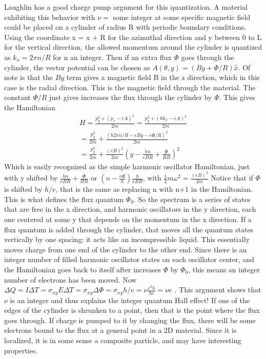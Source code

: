 Laughlin has a good charge pump argument for this quantization. A material exhibiting this behavior with $\nu = $ some integer at some specific magnetic field could be placed on a cylinder of radius R with periodic boundary conditions. Using the coordinate x = x + R for the azimuthal direction and y between 0 to L for the vertical direction, the allowed momentum around the cylinder is quantized as $k_x= 2\pi n/R$ for n an integer. Then if an extra flux $\Phi$ goes through the cylinder, the vector potential can be chosen as $A(\theta,y) = (By+\Phi /R)\hat{x}$. Of note is that the $By$ term gives a magnetic field B in the z direction, which in this case is the radial direction. This is the magnetic field through the material. The constant $\Phi/R$ just gives increases the flux through the cylinder by $\Phi$. This gives the Hamiltonian 
\begin{align}
H = \frac{p_y^2 +(p_x-eA)^2}{2m} = \frac{p_y^2 +(\hbar k_x - eA)^2}{2m} \\
= \frac{p_y^2}{2m} +\frac{(\hbar 2\pi n/R-eBy-e\Phi /R )^2}{2m}\\
= \frac{p_y^2}{2m} +\frac{(eB)^2}{2m}(y-\frac{hn}{eBR}+\frac{\Phi }{RB} )^2
\end{align}
Which is easily recognized as the simple harmonic oscillator Hamiltonian, just with y shifted by $\frac{hn}{eBR}+\frac{\Phi }{RB}$ or $(n-\frac{e\Phi}{h})\frac{h}{eBR}$, with $\frac{1}{2}m\omega^2 = \frac{(eB)^2}{2m}$
Notice that if $\Phi$ is shifted by $h/e$, that is the same as replacing n with n+1 in the Hamiltonian. This is what defines the flux quantum $\Phi_0$. So the spectrum is a series of states that are free in the x direction, and harmonic oscillators in the y direction, each one centered at some y that depends on the momentum in the x direction. If a flux quantum is added through the cylinder, that moves all the quantum states vertically by one spacing; it acts like an incompressible liquid. This essentially moves charge from one end of the cylinder to the other end. Since there is an integer number of filled harmonic oscillator states on each oscillator center, and the Hamiltonian goes back to itself after increases $\Phi$ by $\Phi_0$, this means an integer number of electrons has been moved. Now $\Delta Q = I \Delta T = \sigma_{xy}E \Delta T = \sigma_{xy} \Delta \Phi = \sigma_{xy} h/e = \nu \frac{e^2h}{he} = \nu e $ . This argument shows that $\nu$ is an integer and thus explains the integer quantum Hall effect! If one of the edges of the cylinder is shrunken to a point, then that is the point where the flux goes through. If charge is pumped to it by changing the flux, there will be some electrons bound to the flux at a general point in a 2D material. Since it is localized, it is in some sense a composite particle, and may have interesting properties.

